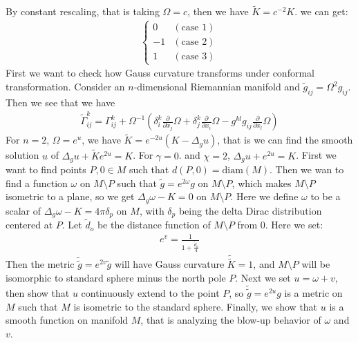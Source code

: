 \documentclass[11pt]{book}
\theoremstyle{break}
\theoremstyle{break}
\newcommand{\pd}{\partial}
\newcommand{\that}[1]{\widetilde{#1}}
\begin{document}
 By constant rescaling, that is taking $\Omega = c$, then we have $\that{K} = c^{-2} K$. we can get:
 \begin{align*}
 \begin{cases}
 0 & (\text{case 1})\\
 -1 & (\text{case 2})\\
 1 & (\text{case 3})
 \end{cases}
 \end{align*}
First we want to check how Gauss curvature transforms under conformal transformation. Consider an $n$-dimensional Riemannian manifold and $\that{g}_{ij} = \Omega^2 g_{ij}$. Then we see that we have
\begin{align*}
\that{\Gamma}_{ij}^k = \Gamma_{ij}^k + \Omega^{-1}\left( \delta_{i}^k \frac{\pd}{\pd x_j}\Omega + \delta_j^k \frac{\pd}{\pd x_i}\Omega - g^{kl}g_{ij}\frac{\pd}{\pd x_l}\Omega \right)
\end{align*}
For $n = 2$, $\Omega = e^u$, we have $\that{K} = e^{-2u}(K - \Delta_gu)$, that is we can find the smooth solution $u$ of $\Delta_g u + \that{K}e^{2u} = K$. For $\gamma  =0$. and $\chi = 2$, $\Delta_g u + e^{2u} = K$. First we want to find points $P, 0 \in M$ such that $d(P,0) = \text{diam}(M)$. Then we wan to find a function $\omega$ on $M\setminus P$ such that $\that{g} = e^{2\omega} g$ on $M\setminus P$, which makes $M\setminus P$ isometric to a plane, so we get $\Delta_g \omega -K =0$ on $M\setminus P$. Here we define $\omega $ to be a scalar of $\Delta_g \omega -K = 4\pi \delta_p$ on $M$, with $\delta_p$ being the delta Dirac  distribution centered at $P$. Let $\that{d}_o$ be the distance function of $M\setminus P$ from $0$. Here we set:
\begin{align*}
e^v = \frac{1}{1+ \frac{\that{d}_o}{4}}
\end{align*}
Then the metric $\that{\that{g}} = e^{2v}\that{g}$ will have Gauss curvature $\that{\that{K}} = 1$, and $M\setminus P$ will be isomorphic to standard sphere minus the north pole $P$. Next we set $u = \omega +v$, then show that $u$ continuously extend to the point $P$, so $\that{\that{g}} = e^{2u}g$ is a metric on $M$ such that $M$ is isometric to the standard sphere. Finally, we show that $u$ is a smooth function on manifold $M$, that is analyzing the blow-up behavior of $\omega$ and $v$.\\
\end{document}
